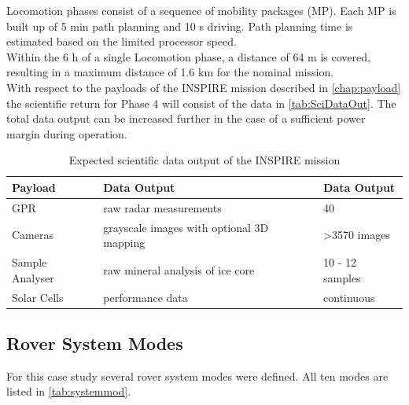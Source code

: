 Locomotion phases consist of a sequence of mobility packages (MP). Each MP is built up of 5 min path planning and 10 s driving. Path planning time is estimated based on the limited processor speed. \\
Within the 6 h of a single Locomotion phase, a distance of 64 m is covered, resulting in a maximum distance of 1.6 km for the nominal mission.  \\

With respect to the payloads of the INSPIRE mission described in \autoref{chap:payload} the scientific return for Phase 4 will consist of the data in \autoref{tab:SciDataOut}.
The total data output can be increased further in the case of a sufficient power margin during operation.

\begin{table}[h]
\centering
\caption{Expected scientific data output of the INSPIRE mission }
\begin{tabular}{lll}
Payload         & Data Output                               & Data Output     \\ \hline\hline
GPR             & raw radar measurements                    & 40              \\
Cameras         & grayscale images with optional 3D mapping & >3570 images     \\
Sample Analyser & raw mineral analysis of ice core          & 10 - 12 samples \\
Solar Cells     & performance data                          & continuous      \\ \hline
\end{tabular}
\label{tab:SciDataOut}
\end{table}

  
\subsection{Rover System Modes}
\label{chap:rovsubmod}
For this case study several rover system modes were defined. All ten modes are listed in \autoref{tab:systemmod}. 

